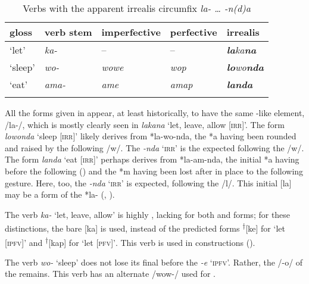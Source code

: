 \begin{table}
\caption{Verbs with the apparent irrealis circumfix \textit{la- … -n(d)a}}
\label{tab:4.5}
\begin{tabularx}{\textwidth}{QQQQQ}
\lsptoprule
gloss & verb stem & imperfective & perfective & irrealis\\
\midrule
‘let’ & {\itshape ka-} & -- & -- & {\itshape \textbf{la}ka\textbf{na}}\\
‘sleep’ & {\itshape wo-} & {\itshape wowe} & {\itshape wop} & {\itshape \textbf{lo}wo\textbf{nda}}\\
‘eat’ & {\itshape ama-} & {\itshape ame} & {\itshape amap} & {\itshape \textbf{landa}}\\
\lspbottomrule
\end{tabularx}
\end{table}
All the  forms given in  appear, at least historically, to have the same -like element, /la-/, which is mostly clearly seen in \textit{lakana} ‘let, leave, allow [\textsc{irr}]’. The form \textit{lowonda} ‘sleep [\textsc{irr}]’ likely derives from *la-wo-nda, the *a having been  rounded and raised by the following  /w/. The  \textit{-nda} ‘\textsc{irr}’ is the expected  following the  /w/. The form \textit{landa} ‘eat [\textsc{irr}]’ perhaps derives from *la-am-nda, the initial *a having  before the following  () and the *m having been lost after  in place to the following  gesture. Here, too, the  \textit{-nda} ‘\textsc{irr}’ is expected, following the  /l/. This initial [la] may be a  form of the   *la- (, ).

  The verb \textit{ka-} ‘let, leave, allow’ is highly , lacking   for both  and  forms; for these  distinctions, the bare  [ka] is used, instead of the predicted forms \textsuperscript{†}[ke] for ‘let [\textsc{ipfv]’} and \textsuperscript{†}[kap] for ‘let [\textsc{pfv]’}. This verb is used in  constructions ().

  The verb \textit{wo-} ‘sleep’ does not lose its final  before the   \textit{{}-e} ‘\textsc{ipfv}’. Rather, the /-o/ of the  remains. This verb has an alternate  /wow-/ used for  .

